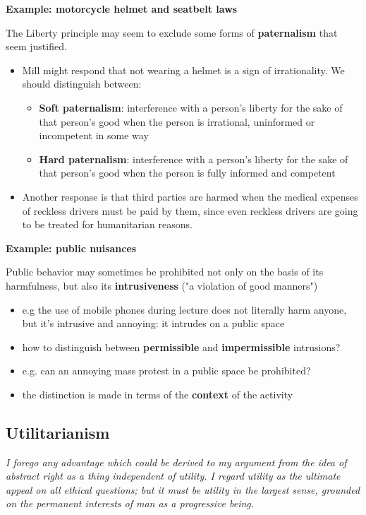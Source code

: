 \textbf{Example: motorcycle helmet and seatbelt laws}

The Liberty principle may seem to exclude some forms of \textbf{paternalism}
that seem justified.

\begin{itemize}
    \item Mill might respond that not wearing a helmet is a sign of
    irrationality. We should distinguish between:
    \begin{itemize}
        \item \textbf{Soft paternalism}: interference with a person's liberty
        for the sake of that person's good when the person is irrational,
        uninformed or incompetent in some way
        \item \textbf{Hard paternalism}: interference with a person's liberty
        for the sake of that person's good when the person is fully informed
        and competent
    \end{itemize}
    \item Another response is that third parties are harmed when the medical
    expenses of reckless drivers must be paid by them, since even reckless
    drivers are going to be treated for humanitarian reasons.
\end{itemize}

\textbf{Example: public nuisances}

Public behavior may sometimes be prohibited not only on the basis of its
harmfulness, but also its \textbf{intrusiveness} ("a violation of good
manners")
\begin{itemize}
    \item e.g the use of mobile phones during lecture does not literally
    harm anyone, but it's intrusive and annoying: it intrudes on a public space
    \item how to distinguish between \textbf{permissible} and
    \textbf{impermissible} intrusions?
    \item e.g. can an annoying mass protest in a public space be prohibited?
    \item the distinction is made in terms of the \textbf{context} of the
    activity
\end{itemize}

\subsection{Utilitarianism}

\textit{I forego any advantage which could be derived to my argument from the
idea of abstract right as a thing independent of utility. I regard utility
as the ultimate appeal on all ethical questions; but it must be utility in the
largest sense, grounded on the permanent interests of man as a progressive
being.}

